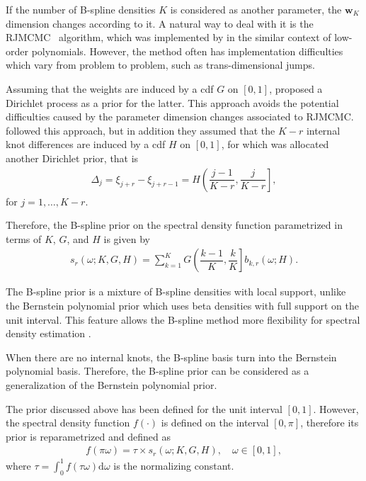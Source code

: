 \documentclass[aps,reprint,amsmath,amssymb,showpacs,showkeys]{revtex4-1}%
\begin{document}
If the number of B-spline densities $K$ is considered as another parameter, the $\bm{w}_K$ dimension changes according to it.  A natural way to deal with it is the RJMCMC~\citep{Green:1995} algorithm, which was implemented by \cite{Gangopadhyay:1999} in the similar context of low-order polynomials.  However, the method often has implementation difficulties which vary from problem to problem, such as trans-dimensional jumps.

Assuming that the weights are induced by a cdf $G$ on $[0,1]$, \cite{Choudhuri:2004} proposed a Dirichlet process as a prior for the latter.  This approach avoids the potential difficulties caused by the parameter dimension changes associated to RJMCMC.  \cite{Edwards2018} followed this approach, but in addition they assumed that the $K-r$ internal knot differences are induced by a cdf $H$ on $[0,1]$, for which was allocated another Dirichlet prior, that is
\begin{align*}
\Delta_{j} = \xi_{j+r} - \xi_{j+r-1} = H\left(\dfrac{j-1}{K-r}, \dfrac{j}{K-r} \right],
\end{align*}
for $j=1,\dots,K-r$.

Therefore, the B-spline prior on the spectral density function parametrized in terms of $K$, $G$, and $H$ is given by
\begin{align*}
s_r(\omega;K,G,H) = \sum_{k=1}^{K} G \left( \dfrac{k-1}{K} , \dfrac{k}{K} \right] b_{k,r}(\omega;H).
\end{align*}

The B-spline prior is a mixture of B-spline densities with local support, unlike the Bernstein polynomial prior which uses beta densities with full support on the unit interval.  This feature allows the B-spline method more flexibility for spectral density estimation \citep{Edwards2018}.

When there are no internal knots, the B-spline basis turn into the Bernstein polynomial basis.  Therefore, the B-spline prior can be considered as a generalization of the Bernstein polynomial prior.  


The prior discussed above has been defined for the unit interval $[0,1]$.  However, the spectral density function $f(\cdot)$ is defined on the interval $[0,\pi]$, therefore its prior is reparametrized and defined as
\begin{align*}
f(\pi \omega) = \tau \times s_r(\omega;K,G,H), \quad \omega \in [0,1],
\end{align*}
where $\tau = \int_{0}^{1}f(\tau \omega)\text{d}\omega$ is the normalizing constant.
\end{document}
